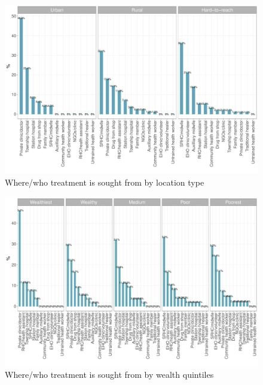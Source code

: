 \documentclass[12pt,a4paper]{article}
\begin{document}
\begin{figure}[H]

{\centering \includegraphics{kayahReport_files/figure-latex/ari5plot-1} 

}

\caption{Where/who treatment is sought from by location type}\label{fig:ari5plot}
\end{figure}

\begin{figure}[H]

{\centering \includegraphics{kayahReport_files/figure-latex/ari6plot-1} 

}

\caption{Where/who treatment is sought from by wealth quintiles}\label{fig:ari6plot}
\end{figure}
\end{document}
